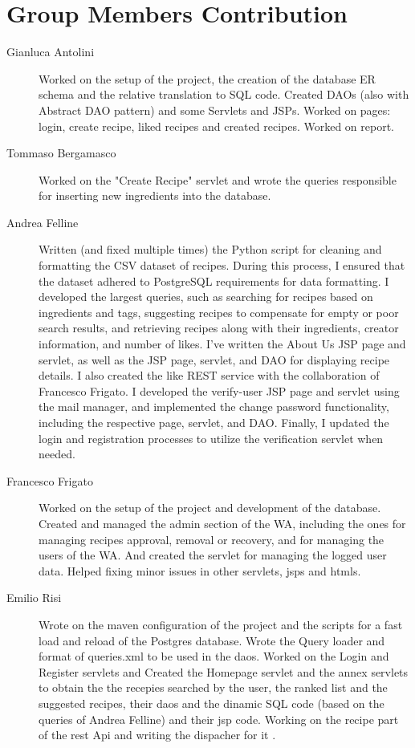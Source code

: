 \section{Group Members Contribution}


\begin{description}
	
	\item[Gianluca Antolini] Worked on the setup of the project, the creation of the database ER schema and the relative translation to SQL code. Created DAOs (also with Abstract DAO pattern) and some Servlets and JSPs. Worked on pages: login, create recipe, liked recipes and created recipes. Worked on report.
 	\item[Tommaso Bergamasco] Worked on the "Create Recipe" servlet and wrote the queries responsible for inserting new ingredients into the database.
	\item[Andrea Felline] Written (and fixed multiple times) the Python script for cleaning and formatting the CSV dataset of recipes. During this process, I ensured that the dataset adhered to PostgreSQL requirements for data formatting. 
    I developed the largest queries, such as searching for recipes based on ingredients and tags, suggesting recipes to compensate for empty or poor search results, and retrieving recipes along with their ingredients, creator information, and number of likes.
    I’ve written the About Us JSP page and servlet, as well as the JSP page, servlet, and DAO for displaying recipe details. 
    I also created the like REST service with the collaboration of Francesco Frigato.
    I developed the verify-user JSP page and servlet using the mail manager, and implemented the change password functionality, including the respective page, servlet, and DAO. Finally, I updated the login and registration processes to utilize the verification servlet when needed.
	\item[Francesco Frigato] Worked on the setup of the project and development of the database. Created and managed the admin section of the WA, including the ones for managing recipes approval, removal or recovery, and for managing the users of the WA. And created the servlet for managing the logged user data. Helped fixing minor issues in other servlets, jsps and htmls.

    \item[Emilio Risi] Wrote on the maven configuration  of the project and the scripts for a fast load and reload of the Postgres database. Wrote the Query loader and  format of queries.xml to be used in the daos. Worked on the Login and Register servlets and  Created  the Homepage servlet and the annex servlets to obtain the the recepies searched by the user, the ranked list and the suggested recipes, their daos and the dinamic SQL code (based on the queries of Andrea Felline) and their
    jsp code. 
    Working on the recipe part of the rest Api and writing  the dispacher for it . 

\end{description}
